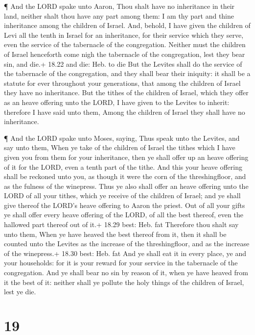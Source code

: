  ¶ And the LORD spake unto Aaron, Thou shalt have no
inheritance in their land, neither shalt thou have any part among them:
I am thy part and thine inheritance among the children of Israel.
 And, behold, I have given the children of Levi all the
tenth in Israel for an inheritance, for their service which they serve,
even the service of the tabernacle of the congregation. 
Neither must the children of Israel henceforth come nigh the tabernacle
of the congregation, lest they bear sin, and die.+ 18.22 and die: Heb.
to die  But the Levites shall do the service of the
tabernacle of the congregation, and they shall bear their iniquity: it
shall be a statute for ever throughout your generations, that among the
children of Israel they have no inheritance.  But the
tithes of the children of Israel, which they offer as an heave offering
unto the LORD, I have given to the Levites to inherit: therefore I have
said unto them, Among the children of Israel they shall have no
inheritance.

 ¶ And the LORD spake unto Moses, saying, 
Thus speak unto the Levites, and say unto them, When ye take of the
children of Israel the tithes which I have given you from them for your
inheritance, then ye shall offer up an heave offering of it for the
LORD, even a tenth part of the tithe.  And this your heave
offering shall be reckoned unto you, as though it were the corn of the
threshingfloor, and as the fulness of the winepress.  Thus
ye also shall offer an heave offering unto the LORD of all your tithes,
which ye receive of the children of Israel; and ye shall give thereof
the LORD's heave offering to Aaron the priest.  Out of all
your gifts ye shall offer every heave offering of the LORD, of all the
best thereof, even the hallowed part thereof out of it.+ 18.29 best:
Heb. fat  Therefore thou shalt say unto them, When ye have
heaved the best thereof from it, then it shall be counted unto the
Levites as the increase of the threshingfloor, and as the increase of
the winepress.+ 18.30 best: Heb. fat  And ye shall eat it
in every place, ye and your households: for it is your reward for your
service in the tabernacle of the congregation.  And ye
shall bear no sin by reason of it, when ye have heaved from it the best
of it: neither shall ye pollute the holy things of the children of
Israel, lest ye die.

\hypertarget{section-18}{%
\section{19}\label{section-18}}

